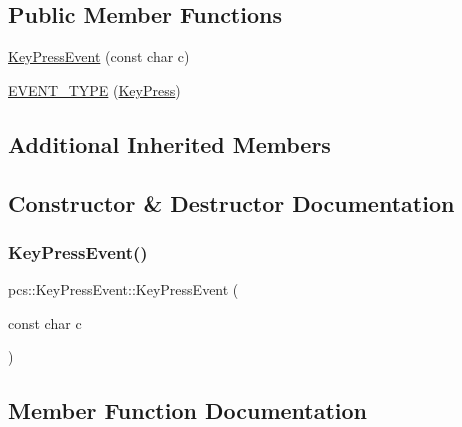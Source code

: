\subsection*{Public Member Functions}
\begin{DoxyCompactItemize}
\item 
\hyperlink{classpcs_1_1KeyPressEvent_a6a9b7a9bb755f168047207c390df91c4}{Key\+Press\+Event} (const char c)
\item 
\hyperlink{classpcs_1_1KeyPressEvent_ad0ceb6d7e128aa6796f7907a0e4c7240}{E\+V\+E\+N\+T\+\_\+\+T\+Y\+PE} (\hyperlink{namespacepcs_a12954f53e3d7d6a8765fd723e1ce8db4a65a1aa093fcf3acd50b318f1942c02f5}{Key\+Press})
\end{DoxyCompactItemize}
\subsection*{Additional Inherited Members}


\subsection{Constructor \& Destructor Documentation}
\mbox{\label{classpcs_1_1KeyPressEvent_a6a9b7a9bb755f168047207c390df91c4}} 
\subsubsection{\texorpdfstring{Key\+Press\+Event()}{KeyPressEvent()}}
{\footnotesize\ttfamily pcs\+::\+Key\+Press\+Event\+::\+Key\+Press\+Event (\begin{DoxyParamCaption}\item[{const char}]{c }\end{DoxyParamCaption})\hspace{0.3cm}{\ttfamily [inline]}}



\subsection{Member Function Documentation}
\mbox{\label{classpcs_1_1KeyPressEvent_ad0ceb6d7e128aa6796f7907a0e4c7240}} 
